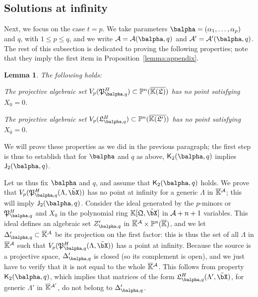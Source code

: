 \documentclass[12pt]{article}
\newtheorem{lemma}[definition]{Lemma}
\begin{document}
\subsection{Solutions at infinity} Next, we focus on the case $t=p$.
We take parameters $\balpha=(\alpha_1,\dots,\alpha_p)$ and $q$, with
$1 \le p \le q$, and we write ${\cal A}={\cal A}(\balpha,q)$ and
${\cal A}'={\cal A}'(\balpha,q)$.  The rest of this subsection is
dedicated to proving the following properties; note that they imply
the first item in Proposition~\ref{lemma:appendix}.

\begin{lemma}The following holds:
\begin{description}[leftmargin=*]
\item[$\assI_2(\balpha,q).$] The projective algebraic set
  $V_p(\mathfrak{P}^H_{\balpha,q}) \subset \P^n(\KKGbar)$ has no point
  satisfying $X_0=0$.
\item[$\assJ_2(\balpha,q).$] The projective algebraic set
  $V_p(\mathfrak{L}^H_{\balpha,q}) \subset \P^n(\KKGpbar)$ has no point
  satisfying $X_0=0$.
\end{description}
\end{lemma}
We will prove these properties as we did in the previous paragraph;
the first step is thus to establish that for $\balpha$ and $q$ as
above, $\assJ_2(\balpha,q)$ implies $\assI_2(\balpha,q)$.

Let us thus fix $\balpha$ and $q$, and assume that
$\assJ_2(\balpha,q)$ holds. We prove that
$V_p(\mathfrak{P}^H_{\balpha,q}(\Lambda,\tilde\bX))$ has no point at
infinity for a generic $\Lambda$ in $\overline{\mathbb{K}}{}^{\cal A}$; this will
imply $\assI_2(\balpha,q)$. Consider the ideal generated by the
$p$-minors or $\mathfrak{P}^H_{\balpha,q}$ and $X_0$ in the polynomial
ring $\KK[\mathfrak{Q},\tilde\bX]$ in ${\cal A}+n+1$ variables. This
ideal defines an algebraic set $Z'_{\balpha,q}$ in $\overline{\mathbb{K}}{}^{\cal A}
\times \mathbb{P}^n(\overline{\mathbb{K}})$, and we let $\Delta'_{\balpha,q} \subset
\KKbar{}^{\cal A}$ be its projection on the first factor: this is thus
the set of all $\Lambda$ in $\overline{\mathbb{K}}{}^{\cal A}$ such that
$V_p(\mathfrak{P}^H_{\balpha,q}(\Lambda,\tilde\bX))$ has a point at
infinity. Because the source is a projective space,
$\Delta'_{\balpha,q}$ is closed (so its complement is open), and we
just have to verify that it is not equal to the whole $\overline{\mathbb{K}}{}^{\cal
  A}$. This follows from property $\assJ_2(\balpha,q)$, which implies
that matrices of the form
$\mathfrak{L}^H_{\balpha,q}(\Lambda',\tilde\bX)$, for generic
$\Lambda'$ in $\overline{\mathbb{K}}{}^{{\cal A}'}$, do not belong to
$\Delta'_{\balpha,q}$.
\end{document}
